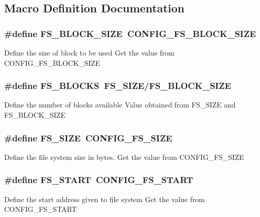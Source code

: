 \subsection{Macro Definition Documentation}
\hypertarget{group__fs_gad6b56bdbbe5838a6260ddc0926fa1891}{
\subsubsection[{F\-S\-\_\-\-B\-L\-O\-C\-K\-\_\-\-S\-I\-Z\-E}]{\setlength{\rightskip}{0pt plus 5cm}\#define F\-S\-\_\-\-B\-L\-O\-C\-K\-\_\-\-S\-I\-Z\-E~C\-O\-N\-F\-I\-G\-\_\-\-F\-S\-\_\-\-B\-L\-O\-C\-K\-\_\-\-S\-I\-Z\-E}}\label{group__fs_gad6b56bdbbe5838a6260ddc0926fa1891}
Define the size of block to be used Get the value from C\-O\-N\-F\-I\-G\-\_\-\-F\-S\-\_\-\-B\-L\-O\-C\-K\-\_\-\-S\-I\-Z\-E \hypertarget{group__fs_ga5534402cd21abf73c1851e468ca502c4}{
\subsubsection[{F\-S\-\_\-\-B\-L\-O\-C\-K\-S}]{\setlength{\rightskip}{0pt plus 5cm}\#define F\-S\-\_\-\-B\-L\-O\-C\-K\-S~{\bf F\-S\-\_\-\-S\-I\-Z\-E}/{\bf F\-S\-\_\-\-B\-L\-O\-C\-K\-\_\-\-S\-I\-Z\-E}}}\label{group__fs_ga5534402cd21abf73c1851e468ca502c4}
Define the number of blocks available Value obtained from F\-S\-\_\-\-S\-I\-Z\-E and F\-S\-\_\-\-B\-L\-O\-C\-K\-\_\-\-S\-I\-Z\-E \hypertarget{group__fs_ga3167e1c51bc79684fdfb78c181075d11}{
\subsubsection[{F\-S\-\_\-\-S\-I\-Z\-E}]{\setlength{\rightskip}{0pt plus 5cm}\#define F\-S\-\_\-\-S\-I\-Z\-E~C\-O\-N\-F\-I\-G\-\_\-\-F\-S\-\_\-\-S\-I\-Z\-E}}\label{group__fs_ga3167e1c51bc79684fdfb78c181075d11}
Define the file system size in bytes. Get the value from C\-O\-N\-F\-I\-G\-\_\-\-F\-S\-\_\-\-S\-I\-Z\-E \hypertarget{group__fs_ga484d3b027c362670c91431b360d8e41a}{
\subsubsection[{F\-S\-\_\-\-S\-T\-A\-R\-T}]{\setlength{\rightskip}{0pt plus 5cm}\#define F\-S\-\_\-\-S\-T\-A\-R\-T~C\-O\-N\-F\-I\-G\-\_\-\-F\-S\-\_\-\-S\-T\-A\-R\-T}}\label{group__fs_ga484d3b027c362670c91431b360d8e41a}
Define the start address given to file system Get the value from C\-O\-N\-F\-I\-G\-\_\-\-F\-S\-\_\-\-S\-T\-A\-R\-T 

